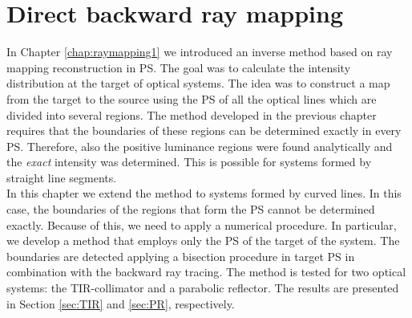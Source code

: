 \chapter{Direct backward ray mapping}
\label{chap:raymapping2}
In Chapter \ref{chap:raymapping1} we introduced an inverse method based on ray mapping reconstruction in PS.
The goal was to calculate the intensity distribution at the target of optical systems. 
The idea was to construct a map from the target  to the source  using the PS of all the optical lines which are divided into several regions.  
The method developed in the previous chapter requires that the boundaries of these regions can be determined exactly in every PS. Therefore, also the positive luminance regions were found analytically and the \textit{exact} intensity was determined. This is possible for systems formed by straight line segments.\\ \indent
In this chapter we extend the method to systems formed by curved lines. In this case, the boundaries of the regions that form the PS cannot be determined exactly.
Because of this, we need to apply a numerical procedure. In particular, we develop a method that employs only the PS of the target of the system. 
The boundaries are detected applying a bisection procedure in target PS in combination with the backward ray tracing. The method is tested for two optical systems: the TIR-collimator and a parabolic reflector. The results are presented in Section \ref{sec:TIR} and \ref{sec:PR}, respectively.
